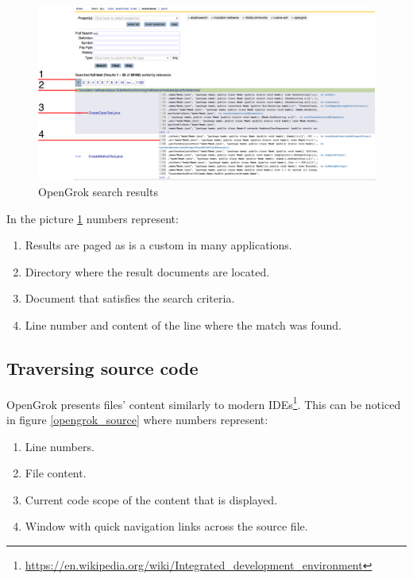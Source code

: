 \begin{figure}[htbp]
    \centering
    \includegraphics[width=145mm]{../img/opengrok_results.png}
    \caption{OpenGrok search results}
    \label{opengrok_results}
\end{figure}

In the picture \ref{opengrok_results} numbers represent:
\begin{enumerate}
    \item Results are paged as is a custom in many applications.
    \item Directory where the result documents are located.
    \item Document that satisfies the search criteria.
    \item Line number and content of the line where the match was found.
\end{enumerate}

\subsection{Traversing source code}

OpenGrok presents files' content similarly to modern
IDEs\footnote{\url{https://en.wikipedia.org/wiki/Integrated_development_environment}}. This can be noticed in figure
\ref{opengrok_source} where numbers represent:

\begin{enumerate}
    \item Line numbers.
    \item File content.
    \item Current code scope of the content that is displayed.
    \item Window with quick navigation links across the source file.
\end{enumerate}

